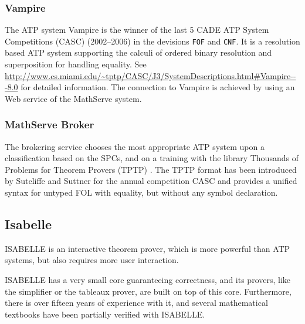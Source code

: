 \documentclass{article}
\newcommand{\normalTEXTSC}[2]{{#1\scriptsize#2}}
\newcommand     {\Isabelle}{\normalTEXTSC{I}{SABELLE}\xspace}
\begin{document}
\subsubsection*{Vampire}
The ATP system Vampire is the winner of the last 5 CADE ATP System
Competitions (CASC) (2002--2006) in the devisions \verb,FOF, and
\verb,CNF,. It is a resolution based ATP system supporting the calculi
of ordered binary resolution and superposition for handling equality.
See
\url{http://www.cs.miami.edu/~tptp/CASC/J3/SystemDescriptions.html#Vampire---8.0}
for detailed information. The connection to Vampire is achieved by
using an Web service of the MathServe system.

\subsubsection*{MathServe Broker}

The brokering service chooses the most appropriate ATP system
upon a classification based on the SPCs, and on a training with the
library Thousands of Problems for Theorem Provers (TPTP)
\cite{ZimmerAutexier06}. The TPTP format
has been introduced by Sutcliffe and Suttner for the annual
competition CASC \cite{Sutcliffe:2006:CASC} and provides a unified
syntax for untyped FOL with equality, but without any symbol
declaration.

\subsection{Isabelle}

\Isabelle \cite{NipPauWen02} is an interactive theorem prover, which is
more powerful than ATP systems, but also requires more user interaction.

\Isabelle
has a very small core guaranteeing correctness, and its provers,
like the simplifier or the tableaux prover, are built on top of this
core. Furthermore, there is over fifteen years of experience with it,
and several mathematical textbooks have been partially
verified with
\Isabelle.
\end{document}
